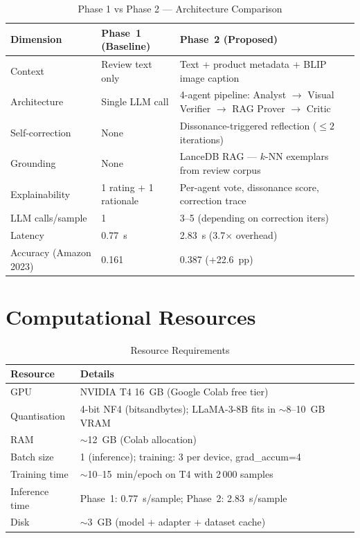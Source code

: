 \documentclass[12pt,a4paper]{article}
\begin{document}
\begin{table}[H]
\centering
\caption{Phase 1 vs Phase 2 --- Architecture Comparison}
\begin{tabular}{lp{5.5cm}p{5.5cm}}
\toprule
\textbf{Dimension} & \textbf{Phase~1 (Baseline)} & \textbf{Phase~2 (Proposed)} \\
\midrule
Context        & Review text only & Text + product metadata + BLIP image caption \\
Architecture   & Single LLM call  & 4-agent pipeline: Analyst $\to$ Visual Verifier $\to$ RAG Prover $\to$ Critic \\
Self-correction & None            & Dissonance-triggered reflection ($\leq 2$ iterations) \\
Grounding      & None            & LanceDB RAG --- $k$-NN exemplars from review corpus \\
Explainability & 1 rating + 1 rationale & Per-agent vote, dissonance score, correction trace \\
LLM calls/sample & 1             & 3--5 (depending on correction iters) \\
Latency        & 0.77~s          & 2.83~s (3.7$\times$ overhead) \\
Accuracy (Amazon 2023) & 0.161 & 0.387 (+22.6~pp) \\
\bottomrule
\end{tabular}
\end{table}

\section{Computational Resources}

\begin{table}[H]
\centering
\caption{Resource Requirements}
\begin{tabular}{ll}
\toprule
\textbf{Resource} & \textbf{Details} \\
\midrule
GPU              & NVIDIA T4 16~GB (Google Colab free tier) \\
Quantisation     & 4-bit NF4 (bitsandbytes); LLaMA-3-8B fits in $\sim$8--10~GB VRAM \\
RAM              & $\sim$12~GB (Colab allocation) \\
Batch size       & 1 (inference); training: 3 per device, grad\_accum=4 \\
Training time    & $\sim$10--15~min/epoch on T4 with 2\,000 samples \\
Inference time   & Phase~1: 0.77~s/sample; Phase~2: 2.83~s/sample \\
Disk             & $\sim$3~GB (model + adapter + dataset cache) \\
\bottomrule
\end{tabular}
\end{table}
\end{document}
